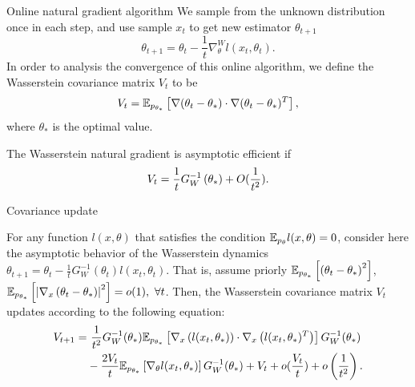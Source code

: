 \documentclass{beamer}
\begin{document}
\begin{frame}{Online natural gradient algorithm}
    We sample from the unknown distribution once in each step, and use sample $x_t$ to get new estimator $\theta_{t + 1}$
    \begin{equation*}\label{iterate}
	\theta_{t+1} = \theta_t -\frac{1}{t}\nabla_{\theta}^W l(x_t, \theta_t).
\end{equation*}
In order to analysis the convergence of this online algorithm, we define the Wasserstein covariance matrix $V_t$ to be
\begin{equation*}
    V_{t} = \mathbb{E}_{p_{\theta_*}}\left[ \nabla (\theta_t - \theta_* ) \cdot \nabla (\theta_t - \theta_* )^T \right],
\end{equation*}
where $\theta_*$ is the optimal value.
\begin{definition}
    The Wasserstein natural gradient is asymptotic efficient if
    \begin{equation*}
        V_t = \frac{1}{t}G_W^{-1}\left( \theta_* \right) + O(\frac{1}{t^2}).
    \end{equation*}
\end{definition}
\end{frame}

\begin{frame}{Covariance update}
\begin{theorem}\label{update}
For any function $l(x,\theta)$ that satisfies the condition $\mathbb{E}_{p_\theta}l(x,\theta) = 0$, consider here the asymptotic behavior of the Wasserstein dynamics $\theta_{t+1} = \theta_t - \frac{1}{t}G_W^{-1}(\theta_t)l(x_t,\theta_t)$. That is, assume priorly $\mathbb{E}_{p_{\theta_*}} \left[ \left( \theta_t - \theta_* \right)^2 \right]$, $\mathbb{E}_{p_{\theta_*}} \left[ \left| \nabla_x \left( \theta_t - \theta_* \right) \right|^2 \right] = o(1), \ \forall t$. Then, the Wasserstein covariance matrix $V_t$ updates according to the following equation: 
\begin{equation*}
    \begin{aligned}
     V_{t+1} = & \ \frac{1}{t^2} G_W^{-1}(\theta_*) \mathbb{E}_{p_{\theta_*}} \left[ \nabla_x \left( l(x_t,\theta_*) \right) \cdot \nabla_x \left( l(x_t,\theta_*)^{T} \right)  \right] G_W^{-1}(\theta_*) \\ 
     & - \frac{2V_t}{t} \mathbb{E}_{p_{\theta_*}} \left[ \nabla_{\theta}l(x_t,\theta_*) \right] G_W^{-1} (\theta_*) + V_t + o(\frac{V_t}{t}) + o\left( \frac{1}{t^2} \right).
	\end{aligned}
\end{equation*}
\end{theorem}
\end{frame}
\end{document}
